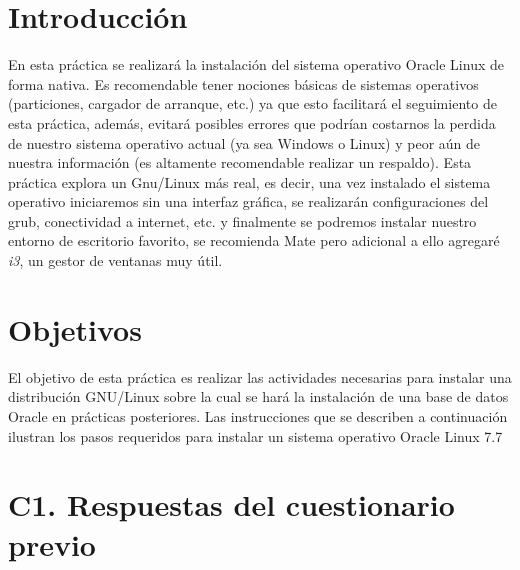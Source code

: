 \documentclass{article}
\begin{document}
\section*{Introducción}
En esta práctica se realizará la instalación del sistema operativo Oracle
Linux de forma nativa. Es recomendable tener nociones básicas de sistemas
operativos (particiones, cargador de arranque, etc.) ya que esto facilitará el 
seguimiento de esta práctica, además, evitará posibles errores que podrían 
costarnos la perdida de nuestro sistema operativo actual (ya sea Windows o 
Linux) y peor aún de nuestra información (es altamente recomendable realizar un
respaldo). Esta práctica explora un Gnu/Linux más real, es decir, una vez 
instalado el sistema operativo iniciaremos sin una interfaz gráfica, se
realizarán configuraciones del grub, conectividad a internet, etc. y finalmente
se podremos instalar nuestro entorno de escritorio favorito, se recomienda Mate
pero adicional a ello agregaré \textit{i3}, un gestor de ventanas muy útil.

\section*{Objetivos}
El objetivo de esta práctica es realizar las actividades necesarias para 
instalar una distribución GNU/Linux sobre la cual se hará la instalación de una
base de datos Oracle en prácticas posteriores. Las instrucciones que se 
describen a continuación ilustran los pasos requeridos para instalar un sistema
operativo Oracle Linux 7.7


\section*{C1. Respuestas del cuestionario previo}
\end{document}
